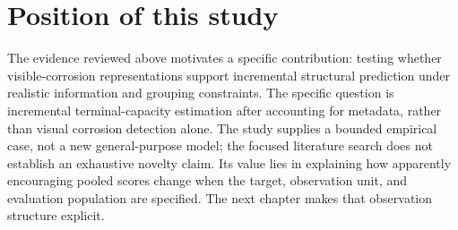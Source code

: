 \section{Position of this study}
The evidence reviewed above motivates a specific contribution: testing whether visible-corrosion representations support incremental structural prediction under realistic information and grouping constraints. The specific question is incremental terminal-capacity estimation after accounting for metadata, rather than visual corrosion detection alone. The study supplies a bounded empirical case, not a new general-purpose model; the focused literature search does not establish an exhaustive novelty claim. Its value lies in explaining how apparently encouraging pooled scores change when the target, observation unit, and evaluation population are specified. The next chapter makes that observation structure explicit.
